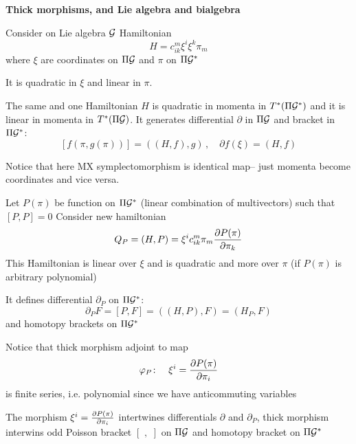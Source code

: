 






\baselineskip=17pt



\def\vare {\varepsilon}
\def\A {{\bf A}}
\def\t {\tilde}
\def\a {\alpha}
\def\K {{\bf K}}
\def\N {{\bf N}}
\def\V {{\cal V}}
\def\s {{\sigma}}
\def\S {{\bf S}}
\def\s {{\sigma}}
\def\bs {{\bf s}}
\def\p{\partial}
\def\vare{{\varepsilon}}
\def\Q {{\bf Q}}
\def\D {{\cal D}}
\def\L {{\cal L}}
\def\GG {{\Gamma}}
\def\G {{\cal G}}
\def\C {{\bf C}}
\def\M {{\cal M}}
\def\Z {{\bf Z}}
\def\U  {{\cal U}}
\def\H {{\cal H}}
\def\R  {{\bf R}}
\def\E  {{\bf E}}
\def\l {\lambda}
\def\degree {{\bf {\rm degree}\,\,}}
\def \finish {${\,\,\vrule height1mm depth2mm width 8pt}$}
\def \m {\medskip}
\def\p {\partial}
\def\r {{\bf r}}
\def\v {{\bf v}}
\def\n {{\bf n}}
\def\t {{\bf t}}
\def\b {{\bf b}}
\def\e{{\bf e}}
\def\f{{\bf f}}
\def\ac {{\bf a}}
\def \X   {{\bf X}}
\def \Y   {{\bf Y}}
\def\diag {\rm diag\,\,}
\def\pt {{\bf p}}
\def\w {\omega}
\def\la{\langle}
\def\ra{\rangle}
\def\x{{\bf x}}
\def\m {\medskip}
\def\thick {{\buildrel \to\over \to}}

  \centerline{\bf Thick morphisms, and Lie algebra and bialgebra}

  Consider on Lie algebra $\G$
 Hamiltonian
    $$
  H=c_{ik}^m\xi^i\xi^k\pi_m
   $$
where $\xi$ are coordinates on $\Pi \G$ and $\pi$ on $\Pi \G^*$

  It is quadratic in $\xi$ and linear in $\pi$.

  The same and one Hamiltonian $H$ is quadratic in momenta
in $T^*(\Pi \G^*)$ and it is linear in momenta in $T^*(\Pi \G)$.
It  generates differential $\p$ in $\Pi \G$ and
bracket in $\Pi \G^*$:
        $$
[f(\pi,g(\pi))]=((H,f),g)\,,\quad \p f(\xi)=(H,f)
        $$

Notice that here MX symplectomorphism is identical map--
just momenta become coordinates and vice versa.

  Let $P(\pi)$ be function on $\Pi \G^*$ 
(linear combination of multivectors)
such that $[P,P]=0$
Consider new hamiltonian
      $$
   Q_P=(H,P)=\xi^ic_{ik}^m\pi_m{\p P(\pi)\over\p \pi_k}
     $$
This Hamiltonian is linear over $\xi$ and is quadratic and more
over $\pi$ (if $P(\pi)$ is arbitrary polynomial)

It defines differential $\p_P$ on $\Pi \G^*$:
         $$
\p_P F=[P,F]=((H,P),F)=(H_P,F)
         $$
and homotopy brackets on $\Pi \G^*$

Notice that thick morphism adjoint to map
    $$
\varphi_P\colon\quad \xi^i={\p P(\pi)\over \p \pi_i}
    $$
is finite series, i.e. polynomial
 since we have anticommuting variables

The morphism $\xi^i={\p P(\pi)\over \p \pi_i}$ 
intertwines differentials $\p$ and $\p_P$,
thick morphism interwins odd Poisson bracket 
$[\,\,,\,\,]$ on $\Pi \G$ and homotopy bracket on $\Pi \G^*$

\bye

